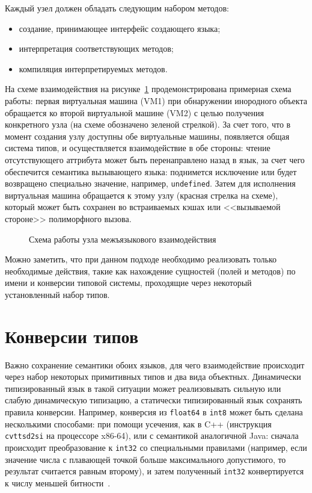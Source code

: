 \documentclass[times
,titlepage
]{itmo-student-thesis}
\begin{document}
Каждый узел должен обладать следующим набором методов:
\begin{itemize}
	\item создание, принимающее интерфейс создающего языка;
	\item интерпретация соответствующих методов;
	\item компиляция интерпретируемых методов.
\end{itemize}
На схеме взаимодействия на рисунке~\ref{fig:create-interop-node} продемонстрирована примерная схема работы: первая виртуальная машина (VM1) при обнаружении инородного объекта обращается ко второй виртуальной машине (VM2) с целью получения конкретного узла (на схеме обозначено зеленой стрелкой). За счет того, что в момент создания узлу доступны обе виртуальные машины, появляется общая система типов, и осуществляется взаимодействие в обе стороны: чтение отсутствующего аттрибута может быть перенаправлено назад в язык, за счет чего обеспечится семантика вызывающего языка: поднимется исключение или будет возвращено специально значение, например, \texttt{undefined}. Затем для исполнения виртуальная машина обращается к этому узлу (красная стрелка на схеме), который может быть сохранен во встраиваемых кэшах или <<вызываемой стороне>> полиморфного вызова.
\begin{figure}[!h]
	\caption{Схема работы узла межъязыкового взаимодействия}\label{fig:create-interop-node}
	\centering
	
\end{figure}

Можно заметить, что при данном подходе необходимо реализовать только необходимые действия, такие как нахождение сущностей (полей и методов) по имени и конверсии типовой системы, проходящие через некоторый установленный набор типов.

\section{Конверсии типов}
Важно сохранение семантики обоих языков, для чего взаимодействие происходит через набор некоторых примитивных типов и два вида объектных. Динамически типизированный язык в такой ситуации может реализовывать сильную или слабую динамическую типизацию, а статически типизированный язык сохранять правила конверсии. Например, конверсия из \texttt{float64} в \texttt{int8} может быть сделана несколькими способами: при помощи усечения, как в C++ (инструкция \texttt{cvttsd2si} на процессоре x86-64), или с семантикой аналогичной Java: сначала происходит преобразование к \texttt{int32} со специальными правилами (например, если значение числа с плавающей точкой больше максимального допустимого, то результат считается равным второму), и затем полученный \texttt{int32} конвертируется к числу меньшей битности~\cite{java8-spec}.
\end{document}
